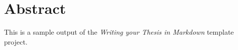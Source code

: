 \chapter*{Abstract}

This is a sample output of the \emph{Writing your Thesis in Markdown} template project.
